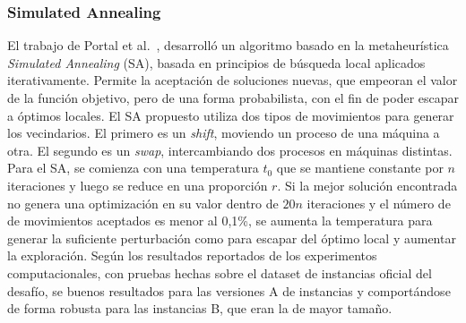 \documentclass[../informe2.tex]{subfiles}
\begin{document}
\subsubsection{Simulated Annealing}
El trabajo de Portal et al.~\cite{portal2015sa}, desarrolló un algoritmo basado en la metaheurística \textit{Simulated Annealing} (SA), basada en principios de búsqueda local aplicados iterativamente. Permite la aceptación de soluciones nuevas, que empeoran el valor de la función objetivo, pero de una forma probabilista, con el fin de poder escapar a  óptimos locales. El SA propuesto utiliza dos tipos de movimientos para generar los vecindarios. El primero es un \textit{shift}, moviendo un proceso de una máquina a otra. El segundo es un \textit{swap}, intercambiando dos procesos en máquinas distintas. Para el SA, se comienza con una temperatura $t_0$ que se mantiene constante por $n$ iteraciones y luego se reduce en una proporción $r$. Si la mejor solución encontrada no genera una optimización en su valor dentro de $20n$ iteraciones y el número de de movimientos aceptados es menor al 0,1\%, se aumenta la temperatura para generar la suficiente perturbación como para escapar del óptimo local y aumentar la exploración. Según los resultados reportados de los experimentos computacionales, con pruebas hechas sobre el dataset de instancias oficial del desafío, se buenos resultados  para las versiones A de instancias y comportándose de forma robusta para las instancias B, que eran la de mayor tamaño.
\end{document}
